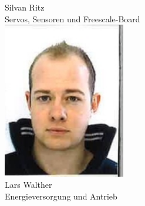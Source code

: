 \begin{minipage}{0.45\textwidth}
\begin{flushleft}
Silvan Ritz\\
Servos, Sensoren und Freescale-Board\\[2ex]
\includegraphics[width=0.4\textwidth]{./04_Projektmanagement/fig/larswalther.jpg}\\
Lars Walther\\
Energieversorgung und Antrieb\\[2ex]
\end{flushleft}
\end{minipage}
\hfill

